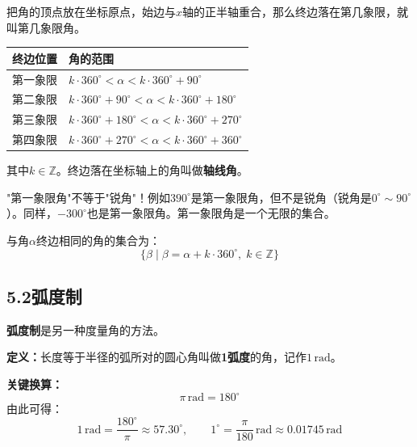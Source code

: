 \documentclass[12pt, a4paper]{ctexart}
\begin{document}
\begin{knowledgebox}[象限角与轴线角]
把角的顶点放在坐标原点，始边与$x$轴的正半轴重合，那么终边落在第几象限，就叫第几象限角。

\medskip
\begin{tabular}{ll}
\toprule
\textbf{终边位置} & \textbf{角的范围} \\
\midrule
第一象限 & $k\cdot360^\circ<\alpha<k\cdot360^\circ+90^\circ$\\
第二象限 & $k\cdot360^\circ+90^\circ<\alpha<k\cdot360^\circ+180^\circ$\\
第三象限 & $k\cdot360^\circ+180^\circ<\alpha<k\cdot360^\circ+270^\circ$\\
第四象限 & $k\cdot360^\circ+270^\circ<\alpha<k\cdot360^\circ+360^\circ$\\
\bottomrule
\end{tabular}

\medskip
其中$k\in\mathbb{Z}$。终边落在坐标轴上的角叫做\textbf{轴线角}。
\end{knowledgebox}

\begin{warnbox}[易错提醒]
"第一象限角"不等于"锐角"！例如$390^\circ$是第一象限角，但不是锐角（锐角是$0^\circ\sim90^\circ$）。同样，$-300^\circ$也是第一象限角。第一象限角是一个无限的集合。
\end{warnbox}

\begin{knowledgebox}[终边相同的角]
与角$\alpha$终边相同的角的集合为：
\[
  \{\beta\mid\beta=\alpha+k\cdot360^\circ,\;k\in\mathbb{Z}\}
\]
\end{knowledgebox}

\subsection*{5.2\quad 弧度制}

\begin{knowledgebox}[弧度的定义]
\textbf{弧度制}是另一种度量角的方法。

\medskip
\textbf{定义：}长度等于半径的弧所对的圆心角叫做\textbf{1弧度}的角，记作$1\,\text{rad}$。

\medskip
\textbf{关键换算：}
\[
  \boxed{\pi\,\text{rad}=180^\circ}
\]
由此可得：
\[
  1\,\text{rad}=\frac{180^\circ}{\pi}\approx57.30^\circ, \qquad
  1^\circ=\frac{\pi}{180}\,\text{rad}\approx0.01745\,\text{rad}
\]
\end{knowledgebox}
\end{document}
